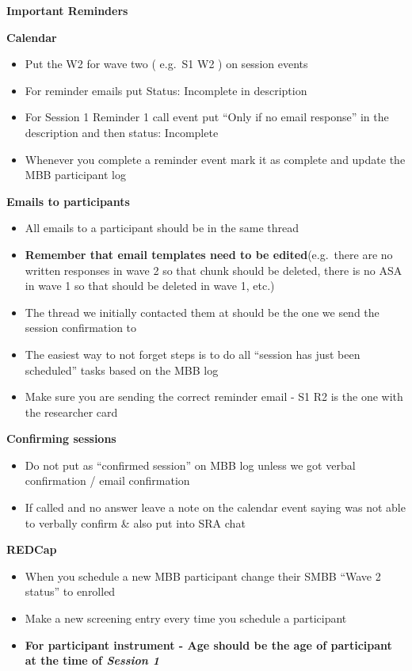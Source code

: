 \documentclass[
]{book}
\providecommand{\tightlist}{%
  \setlength{\itemsep}{0pt}\setlength{\parskip}{0pt}}
\begin{document}
\textbf{Important Reminders}

\textbf{Calendar}

\begin{itemize}
\tightlist
\item
  Put the W2 for wave two ( e.g.~S1 W2 ) on session events
\item
  For reminder emails put Status: Incomplete in description
\item
  For Session 1 Reminder 1 call event put ``Only if no email response'' in the description and then status: Incomplete
\item
  Whenever you complete a reminder event mark it as complete and update the MBB participant log
\end{itemize}

\textbf{Emails to participants}

\begin{itemize}
\tightlist
\item
  All emails to a participant should be in the same thread\\
\item
  \textbf{Remember that email templates need to be edited}(e.g.~there are no written responses in wave 2 so that chunk should be deleted, there is no ASA in wave 1 so that should be deleted in wave 1, etc.)
\item
  The thread we initially contacted them at should be the one we send the session confirmation to\\
\item
  The easiest way to not forget steps is to do all ``session has just been scheduled'' tasks based on the MBB log\\
\item
  Make sure you are sending the correct reminder email - S1 R2 is the one with the researcher card
\end{itemize}

\textbf{Confirming sessions}

\begin{itemize}
\tightlist
\item
  Do not put as ``confirmed session'' on MBB log unless we got verbal confirmation / email confirmation
\item
  If called and no answer leave a note on the calendar event saying was not able to verbally confirm \& also put into SRA chat
\end{itemize}

\textbf{REDCap}

\begin{itemize}
\tightlist
\item
  When you schedule a new MBB participant change their SMBB ``Wave 2 status'' to enrolled\\
\item
  Make a new screening entry every time you schedule a participant
\item
  \textbf{For participant instrument - Age should be the age of participant at the time of \emph{Session 1} }
\end{itemize}
\end{document}
